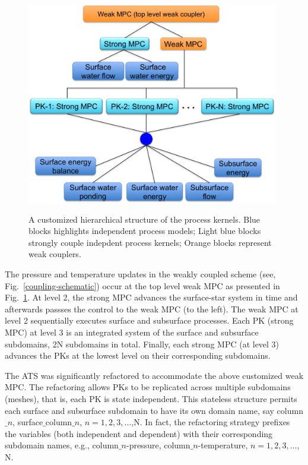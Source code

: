 \documentclass[review]{elsarticle}
\begin{document}
\begin{figure}[!htpb]
\centering
\includegraphics[height = 9.5cm, width=11cm]{figures/process-tree.png}
\caption{A customized hierarchical structure of the process kernels. Blue blocks highlights independent process models; Light blue blocks strongly couple indepdent process kernels; Orange blocks represent weak couplers.}
\label{pk-tree}
\end{figure}

The pressure and temperature updates in the weakly coupled scheme (see, Fig.~\ref{coupling-schematic}) occur at the top level weak MPC as presented in Fig.~\ref{pk-tree}. At level 2, the strong MPC advances the surface-star system in time and afterwards passses the control to the weak MPC (to the left). The weak MPC at level 2 sequentially executes surface and subsurface processes. Each PK (strong MPC) at level 3 is an integrated system of the surface and subsurface subdomains, 2N subdomains in total. Finally, each strong MPC (at level 3) advances the PKs at the lowest level on their corresponding subdomains. 

The ATS was significantly refactored to accommodate the above customized weak MPC. The refactoring allows PKs to be replicated across multiple subdomains (meshes), that is, each PK is state independent. This stateless structure permits each surface and subsurface subdomain to have its own domain name, say 
column$\_n$, surface$\_$column$\_n$, $n=1,2,3, \dots$,N. In fact, the refactoring strategy prefixes the variables (both independent and dependent) with their corresponding subdomain names, e.g., column$\_n$-pressure, column$\_n$-temperature, $n=1,2,3, \dots$, N.
\end{document}
